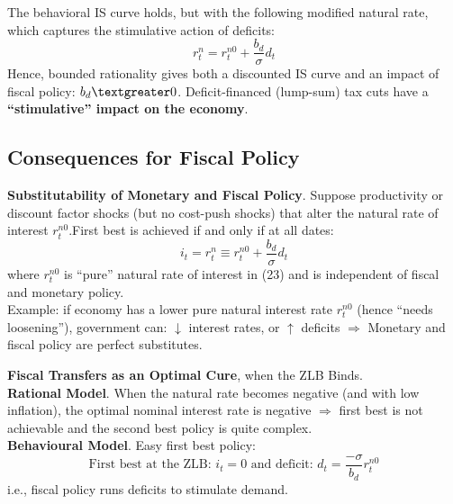\documentclass{beamer}
\begin{document}
\begin{frame}{\subsecname}
    The behavioral IS curve holds, but with the following modified natural rate, which captures the stimulative action of deficits:
    \begin{equation}\tag{45}
        r_{t}^{n}=r_{t}^{n0}+\frac{b_{d}}{\sigma}d_{t}
    \end{equation}
    Hence, bounded rationality gives both a discounted IS curve and an impact of fiscal policy: $b_{d} \textgreater 0$. Deficit-financed (lump-sum) tax cuts have a \textbf{“stimulative” impact on the economy}.
\end{frame}

\subsection{Consequences for Fiscal Policy}

\begin{frame}{\subsecname}
    \textbf{Substitutability of Monetary and Fiscal Policy}. Suppose productivity or discount factor shocks (but no cost-push shocks) that alter the natural rate of interest $r_{t}^{n0}$.First best is achieved if and only if at all dates:
    \begin{equation}\tag{46}
        i_{t}=r_{t}^{n}\equiv r_{t}^{n0}+\frac{b_{d}}{\sigma}d_{t}
    \end{equation}
    where $r_{t}^{n0}$ is “pure” natural rate of interest in (23) and is independent of fiscal and monetary policy.\\
    \hfill \linebreak
    Example: if economy has a lower pure natural interest rate $r_{t}^{n0}$ (hence “needs loosening”), government can: $\downarrow$ interest rates, or $\uparrow$ deficits $\Rightarrow$ Monetary and fiscal policy are perfect substitutes.  
\end{frame}

\begin{frame}{\subsecname}
    \textbf{Fiscal Transfers as an Optimal Cure}, when the ZLB Binds. \\
    \hfill \linebreak
    \textbf{Rational Model}. When the natural rate becomes negative (and with low inflation), the optimal nominal interest rate is negative $\Rightarrow$ first best is not achievable and the second best policy is quite complex.\\
    \hfill \linebreak
    \textbf{Behavioural Model}. Easy first best policy:
    \begin{equation}\tag{47}
        \text{First best at the ZLB: } i_{t}=0 \text{ and deficit: } d_{t}=\frac{-\sigma}{b_{d}}r_{t}^{n0}
    \end{equation}
    i.e., fiscal policy runs deficits to stimulate demand.
\end{frame}
\end{document}
